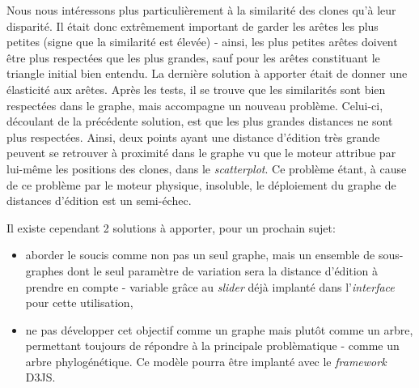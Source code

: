\documentclass[pdftex,12pt,a4paper]{report}
\begin{document}
\begin{spacing}{1.2}
Nous nous intéressons plus particulièrement à la similarité des clones qu'à leur disparité. Il était donc extrêmement important de garder les arêtes les plus petites (signe que la similarité est élevée) - ainsi, les plus petites arêtes doivent être plus respectées que les plus grandes, sauf pour les arêtes constituant le triangle initial bien entendu. La dernière solution à apporter était de donner une élasticité aux arêtes. Après les tests, il se trouve que les similarités sont bien respectées dans le graphe, mais accompagne un nouveau problème. Celui-ci, découlant de la précédente solution, est que les plus grandes distances ne sont plus respectées. Ainsi, deux points ayant une distance d'édition très grande peuvent se retrouver à proximité dans le graphe vu que le moteur attribue par lui-même les positions des clones, dans le \textit{scatterplot}. Ce problème étant, à cause de ce problème par le moteur physique, insoluble, le déploiement du graphe de distances d'édition est un semi-échec.

Il existe cependant 2 solutions à apporter, pour un prochain sujet:
\begin{itemize}
\item{aborder le soucis comme non pas un seul graphe, mais un ensemble de sous-graphes dont le seul paramètre de variation sera la distance d'édition à prendre en compte - variable grâce au \textit{slider} déjà implanté dans l'\textit{interface} pour cette utilisation,}
\item{ne pas développer cet objectif comme un graphe mais plutôt comme un arbre, permettant toujours de répondre à la principale problèmatique - comme un arbre phylogénétique. Ce modèle pourra être implanté avec le \textit{framework} D3JS.}
\end{itemize}


\end{spacing}
\end{document}
